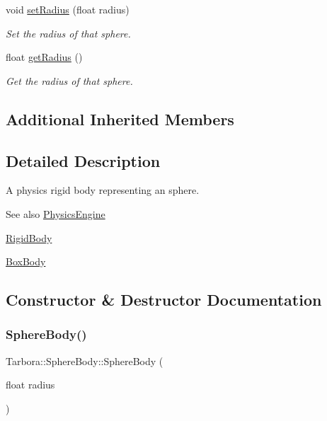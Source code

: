 \begin{DoxyCompactItemize}
void \hyperlink{classTarbora_1_1SphereBody_a60e5b823f2d7db527252840691078a92}{set\+Radius} (float radius)
\begin{DoxyCompactList}\small\item\em Set the radius of that sphere. \end{DoxyCompactList}\item 
\mbox{\label{classTarbora_1_1SphereBody_a8c2285ff2cdac58b5955202c715990b0}} 
float \hyperlink{classTarbora_1_1SphereBody_a8c2285ff2cdac58b5955202c715990b0}{get\+Radius} ()
\begin{DoxyCompactList}\small\item\em Get the radius of that sphere. \end{DoxyCompactList}\end{DoxyCompactItemize}
\subsection*{Additional Inherited Members}


\subsection{Detailed Description}
A physics rigid body representing an sphere. 

\begin{DoxySeeAlso}{See also}
\hyperlink{classTarbora_1_1PhysicsEngine}{Physics\+Engine} 

\hyperlink{classTarbora_1_1RigidBody}{Rigid\+Body} 

\hyperlink{classTarbora_1_1BoxBody}{Box\+Body} 
\end{DoxySeeAlso}


\subsection{Constructor \& Destructor Documentation}
\mbox{\label{classTarbora_1_1SphereBody_a35e582dfbc4660cb796360ceec62e168}} 
\subsubsection{\texorpdfstring{Sphere\+Body()}{SphereBody()}}
{\footnotesize\ttfamily Tarbora\+::\+Sphere\+Body\+::\+Sphere\+Body (\begin{DoxyParamCaption}\item[{float}]{radius }\end{DoxyParamCaption})}



